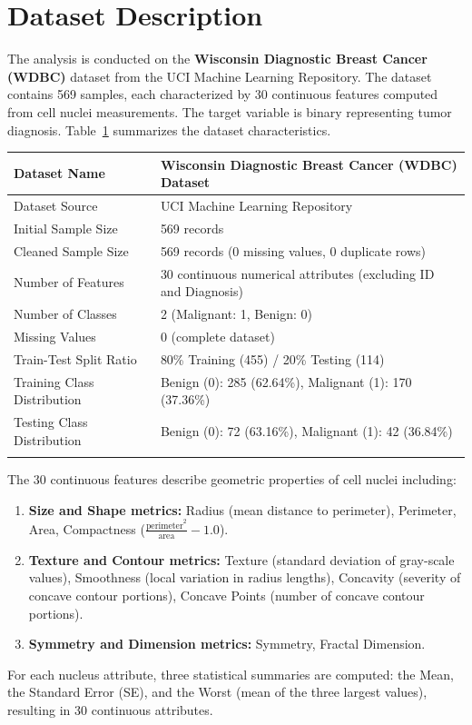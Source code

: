 \documentclass[12pt,a4paper]{article}
\begin{document}
\section{Dataset Description}
The analysis is conducted on the \textbf{Wisconsin Diagnostic Breast Cancer (WDBC)} dataset from the UCI Machine Learning Repository. The dataset contains 569 samples, each characterized by 30 continuous features computed from cell nuclei measurements. The target variable is binary representing tumor diagnosis. Table~\ref{tab:dataset_summary} summarizes the dataset characteristics.

\begin{longtable}{|p{6cm}|p{8cm}|}
\hline
Dataset Name & Wisconsin Diagnostic Breast Cancer (WDBC) Dataset \\ \hline
Dataset Source & UCI Machine Learning Repository \\ \hline
Initial Sample Size & 569 records \\ \hline
Cleaned Sample Size & 569 records (0 missing values, 0 duplicate rows) \\ \hline
Number of Features & 30 continuous numerical attributes (excluding ID and Diagnosis) \\ \hline
Number of Classes & 2 (Malignant: 1, Benign: 0) \\ \hline
Missing Values & 0 (complete dataset) \\ \hline
Train-Test Split Ratio & 80\% Training (455) / 20\% Testing (114) \\ \hline
Training Class Distribution & Benign (0): 285 (62.64\%), Malignant (1): 170 (37.36\%) \\ \hline
Testing Class Distribution & Benign (0): 72 (63.16\%), Malignant (1): 42 (36.84\%) \\ \hline
\label{tab:dataset_summary}
\end{longtable}

The 30 continuous features describe geometric properties of cell nuclei including:
\begin{enumerate}
    \item \textbf{Size and Shape metrics:} Radius (mean distance to perimeter), Perimeter, Area, Compactness ($\frac{\text{perimeter}^2}{\text{area}} - 1.0$).
    \item \textbf{Texture and Contour metrics:} Texture (standard deviation of gray-scale values), Smoothness (local variation in radius lengths), Concavity (severity of concave contour portions), Concave Points (number of concave contour portions).
    \item \textbf{Symmetry and Dimension metrics:} Symmetry, Fractal Dimension.
\end{enumerate}
For each nucleus attribute, three statistical summaries are computed: the Mean, the Standard Error (SE), and the Worst (mean of the three largest values), resulting in 30 continuous attributes.
\end{document}
